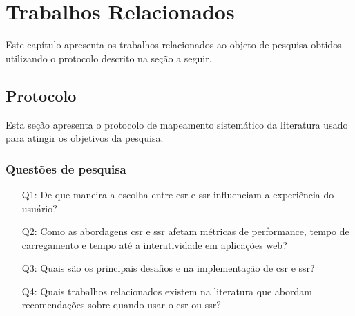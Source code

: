 \chapter{Trabalhos Relacionados}
\label{cap:trabalhos}
Este capítulo apresenta os trabalhos relacionados ao objeto de pesquisa obtidos utilizando o protocolo descrito na seção a seguir.

\section{Protocolo}
Esta seção apresenta o protocolo de mapeamento sistemático da literatura usado para atingir os objetivos da pesquisa.

\subsection{Questões de pesquisa}
\label{section:questoes_pesquisa}
\begin{enumerate}
    \item[Q1:] De que maneira a escolha entre \acrshort{csr} e \acrshort{ssr} influenciam a experiência do usuário?
    \item[Q2:] Como as abordagens \acrshort{csr} e \acrshort{ssr} afetam métricas de performance, tempo de carregamento e tempo até a interatividade em aplicações web?
    \item[Q3:] Quais são os principais desafios e  na implementação de \acrshort{csr} e \acrshort{ssr}?
    \item[Q4:] Quais trabalhos relacionados existem na literatura que abordam recomendações sobre quando usar o \acrshort{csr} ou \acrshort{ssr}?

\end{enumerate}

